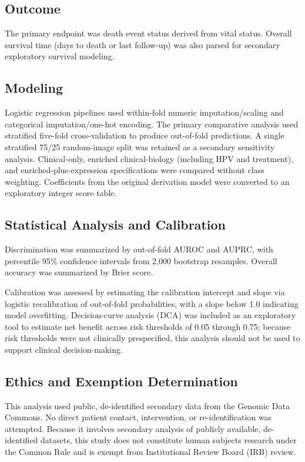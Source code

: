 \documentclass[11pt]{article}
\begin{document}
\subsection{Outcome}
The primary endpoint was death event status derived from vital status. Overall survival time (days to death or last follow-up) was also parsed for secondary exploratory survival modeling.

\subsection{Modeling}
Logistic regression pipelines used within-fold numeric imputation/scaling and categorical imputation/one-hot encoding. The primary comparative analysis used stratified five-fold cross-validation to produce out-of-fold predictions. A single stratified 75/25 random-image split was retained as a secondary sensitivity analysis. Clinical-only, enriched clinical-biology (including HPV and treatment), and enriched-plus-expression specifications were compared without class weighting. Coefficients from the original derivation model were converted to an exploratory integer score table.

\subsection{Statistical Analysis and Calibration}
Discrimination was summarized by out-of-fold AUROC and AUPRC, with percentile 95\% confidence intervals from 2,000 bootstrap resamples. Overall accuracy was summarized by Brier score. 

Calibration was assessed by estimating the calibration intercept and slope via logistic recalibration of out-of-fold probabilities, with a slope below 1.0 indicating model overfitting. Decision-curve analysis (DCA) was included as an exploratory tool to estimate net benefit across risk thresholds of 0.05 through 0.75; because risk thresholds were not clinically prespecified, this analysis should not be used to support clinical decision-making.

\subsection{Ethics and Exemption Determination}
This analysis used public, de-identified secondary data from the Genomic Data Commons. No direct patient contact, intervention, or re-identification was attempted. Because it involves secondary analysis of publicly available, de-identified datasets, this study does not constitute human subjects research under the Common Rule and is exempt from Institutional Review Board (IRB) review.
\end{document}
